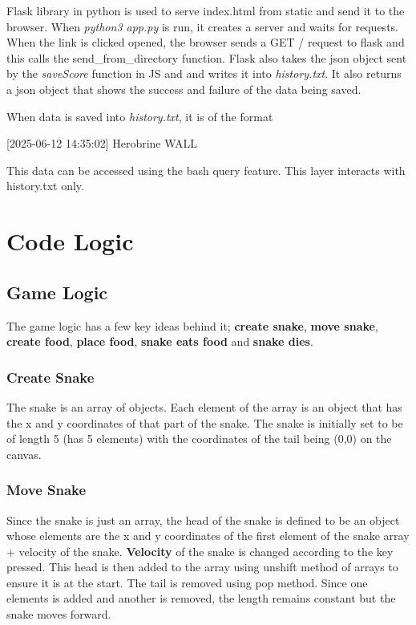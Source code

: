 \documentclass[12pt, letterpaper]{article}
\begin{document}
Flask library in python is used to serve index.html from static and send it to the browser. When \textit{python3 app.py} is run, it creates a server and waits for requests. When the link is clicked opened, the browser sends a GET / request to flask and this calls the send\_from\_directory function. Flask also takes the json object sent by the \textit{saveScore} function in JS and
and writes it into \textit{history.txt}. It also returns a json object that shows the success and failure of the data being saved.

When data is saved into \textit{history.txt}, it is of the format 

\begin{center}
    [2025-06-12 14:35:02] Herobrine  \textbar WALL 
\end{center}

This data can be accessed using the bash query feature. This layer interacts with history.txt only.

\section{Code Logic}
\subsection{Game Logic}
The game logic has a few key ideas behind it; \textbf{create snake}, \textbf{move snake}, \textbf{create food}, \textbf{place food}, \textbf{snake eats food} and \textbf{snake dies}.
\subsubsection{Create Snake}
The snake is an array of objects. Each element of the array is an object that has the x and y coordinates of that part of the snake. The snake is initially set to be of length 5 (has 5 elements) with the coordinates of the tail being (0,0) on the canvas.

\subsubsection{Move Snake}
Since the snake is just an array, the head of the snake is defined to be an object whose elements are the x and y coordinates of the first element of the snake array + velocity of the snake. \textbf{Velocity} of the snake is changed according to the key pressed. This head is then added to the array  using unshift method of arrays to ensure it is at the start. The tail is removed using pop method. Since one elements is added and another is removed, the length remains constant but the snake moves forward.
\end{document}

